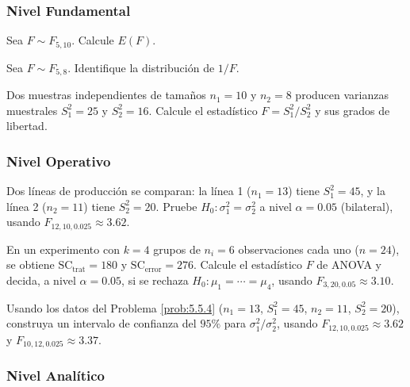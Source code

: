 \subsubsection*{Nivel Fundamental}

\begin{problema}
	\label{prob:5.5.1}
	Sea $F \sim F_{5,10}$. Calcule $E(F)$.
\end{problema}

\begin{problema}
	\label{prob:5.5.2}
	Sea $F \sim F_{5,8}$. Identifique la distribución de $1/F$.
\end{problema}

\begin{problema}
	\label{prob:5.5.3}
	Dos muestras independientes de tamaños $n_1=10$ y $n_2=8$ producen varianzas muestrales $S_1^2=25$ y $S_2^2=16$. Calcule el estadístico $F=S_1^2/S_2^2$ y sus grados de libertad.
\end{problema}

\subsubsection*{Nivel Operativo}

\begin{problema}
	\label{prob:5.5.4}
	Dos líneas de producción se comparan: la línea 1 ($n_1=13$) tiene $S_1^2=45$, y la línea 2 ($n_2=11$) tiene $S_2^2=20$. Pruebe $H_0:\sigma_1^2=\sigma_2^2$ a nivel $\alpha=0.05$ (bilateral), usando $F_{12,10,0.025}\approx 3.62$.
\end{problema}

\begin{problema}
	\label{prob:5.5.5}
	En un experimento con $k=4$ grupos de $n_i=6$ observaciones cada uno ($n=24$), se obtiene $\text{SC}_{\text{trat}}=180$ y $\text{SC}_{\text{error}}=276$. Calcule el estadístico $F$ de ANOVA y decida, a nivel $\alpha=0.05$, si se rechaza $H_0:\mu_1=\cdots=\mu_4$, usando $F_{3,20,0.05}\approx 3.10$.
\end{problema}

\begin{problema}
	\label{prob:5.5.6}
	Usando los datos del Problema \ref{prob:5.5.4} ($n_1=13$, $S_1^2=45$, $n_2=11$, $S_2^2=20$), construya un intervalo de confianza del $95\%$ para $\sigma_1^2/\sigma_2^2$, usando $F_{12,10,0.025}\approx 3.62$ y $F_{10,12,0.025}\approx 3.37$.
\end{problema}

\subsubsection*{Nivel Analítico}

